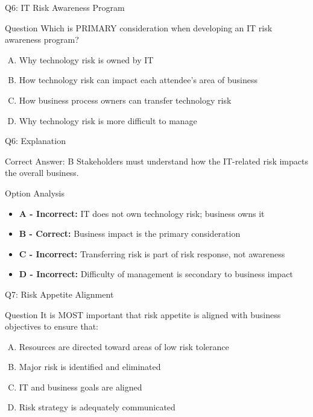 \documentclass{beamer}
\begin{document}
	
	\begin{frame}{Q6: IT Risk Awareness Program}
		\begin{block}{Question}
			Which is PRIMARY consideration when developing an IT risk awareness program?
		\end{block}
		\begin{enumerate}[(A)]
			\item Why technology risk is owned by IT
			\item How technology risk can impact each attendee's area of business
			\item How business process owners can transfer technology risk
			\item Why technology risk is more difficult to manage
		\end{enumerate}
	\end{frame}
	
	\begin{frame}{Q6: Explanation}
		\begin{block}{Correct Answer: B}
			Stakeholders must understand how the IT-related risk impacts the overall business.
		\end{block}
		\begin{block}{Option Analysis}
			\begin{itemize}
				\item \textbf{A - Incorrect:} IT does not own technology risk; business owns it
				\item \textbf{B - Correct:} Business impact is the primary consideration
				\item \textbf{C - Incorrect:} Transferring risk is part of risk response, not awareness
				\item \textbf{D - Incorrect:} Difficulty of management is secondary to business impact
			\end{itemize}
		\end{block}
	\end{frame}
	
	\begin{frame}{Q7: Risk Appetite Alignment}
		\begin{block}{Question}
			It is MOST important that risk appetite is aligned with business objectives to ensure that:
		\end{block}
		\begin{enumerate}[(A)]
			\item Resources are directed toward areas of low risk tolerance
			\item Major risk is identified and eliminated
			\item IT and business goals are aligned
			\item Risk strategy is adequately communicated
		\end{enumerate}
	\end{frame}
	
\end{document}
